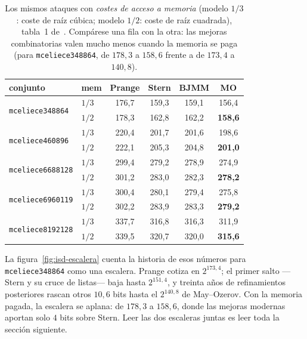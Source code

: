 \documentclass[11pt,a4paper,oneside]{report}
\begin{document}
\begin{table}[htbp]
\centering
\footnotesize
\setlength{\tabcolsep}{5pt}
\begin{tabular}{llcccc}
\toprule
conjunto & mem & Prange & Stern & BJMM & MO\\
\midrule
\multirow{2}{*}{\texttt{mceliece348864}} & $1/3$ & 176{,}7 & 159{,}3 & 159{,}1 & 156{,}4\\
                                        & $1/2$ & 178{,}3 & 162{,}8 & 162{,}2 & \textbf{158{,}6}\\
\multirow{2}{*}{\texttt{mceliece460896}} & $1/3$ & 220{,}4 & 201{,}7 & 201{,}6 & 198{,}6\\
                                        & $1/2$ & 222{,}1 & 205{,}3 & 204{,}8 & \textbf{201{,}0}\\
\multirow{2}{*}{\texttt{mceliece6688128}} & $1/3$ & 299{,}4 & 279{,}2 & 278{,}9 & 274{,}9\\
                                         & $1/2$ & 301{,}2 & 283{,}0 & 282{,}3 & \textbf{278{,}2}\\
\multirow{2}{*}{\texttt{mceliece6960119}} & $1/3$ & 300{,}4 & 280{,}1 & 279{,}4 & 275{,}8\\
                                         & $1/2$ & 302{,}2 & 283{,}9 & 283{,}3 & \textbf{279{,}2}\\
\multirow{2}{*}{\texttt{mceliece8192128}} & $1/3$ & 337{,}7 & 316{,}8 & 316{,}3 & 311{,}9\\
                                         & $1/2$ & 339{,}5 & 320{,}7 & 320{,}0 & \textbf{315{,}6}\\
\bottomrule
\end{tabular}
\caption{Los mismos ataques con \emph{costes de acceso a memoria}
(modelo $1/3$: coste de raíz cúbica; modelo $1/2$: coste de raíz
cuadrada), tabla~1 de~\cite{cmsecurity}. Compárese una fila con la
otra: las mejoras combinatorias valen mucho menos cuando la memoria se
paga (para \texttt{mceliece348864}, de $178{,}3$ a $158{,}6$ frente a
de $173{,}4$ a $140{,}8$).}
\label{tab:isd-mem}
\end{table}

La figura~\ref{fig:isd-escalera} cuenta la historia de esos números
para \texttt{mceliece348864} como una escalera. Prange cotiza en
$2^{173{,}4}$; el primer salto ---Stern y su cruce de listas--- baja
hasta $2^{151{,}4}$, y treinta años de refinamientos posteriores
rascan otros $10{,}6$ bits hasta el $2^{140{,}8}$ de May--Ozerov. Con
la memoria pagada, la escalera se aplana: de $178{,}3$ a $158{,}6$,
donde las mejoras modernas aportan solo $4$ bits sobre Stern. Leer
las dos escaleras juntas es leer toda la sección siguiente.
\end{document}
